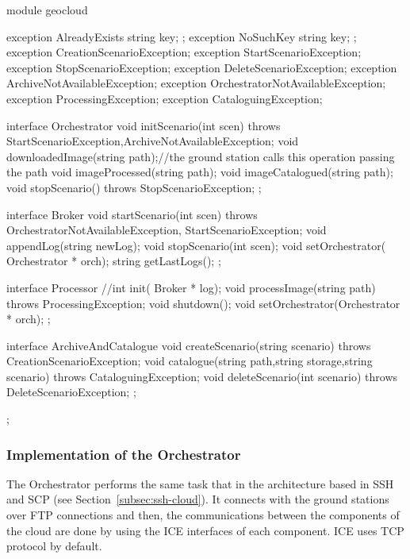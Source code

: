 \begin{listing}[
  float=h!,
  caption  = {Slice of the ICE application},
  label    = code:ice-slice,
style=customc]

module geocloud {
    exception AlreadyExists { string key; };
    exception NoSuchKey { string key; };
    exception CreationScenarioException{};
    exception StartScenarioException{};
    exception StopScenarioException{};
    exception DeleteScenarioException{};
    exception ArchiveNotAvailableException{};
    exception OrchestratorNotAvailableException{};
    exception ProcessingException{};
    exception CataloguingException{};

    interface Orchestrator{
    	void initScenario(int scen) throws StartScenarioException,ArchiveNotAvailableException;
	void downloadedImage(string path);//the ground station calls this operation passing the path
	void imageProcessed(string path);
	void imageCatalogued(string path);
	void stopScenario() throws StopScenarioException;
    };

    interface Broker{
	void startScenario(int scen) throws OrchestratorNotAvailableException, StartScenarioException;
	void appendLog(string newLog);
	void stopScenario(int scen);
	void setOrchestrator( Orchestrator * orch);
	string getLastLogs();
    };


 interface Processor{
	//int init( Broker * log);
       	void processImage(string path) throws ProcessingException;
	void shutdown();
	void setOrchestrator(Orchestrator * orch);
    };



    interface ArchiveAndCatalogue{
	void createScenario(string scenario) throws CreationScenarioException;
	void catalogue(string path,string storage,string scenario) throws CataloguingException;
	void deleteScenario(int scenario) throws DeleteScenarioException;
    };
};
\end{listing}

\subsubsection{Implementation of the Orchestrator}

The Orchestrator performs the same task that in the architecture based in
\ac{SSH} and \ac{SCP} (see Section~\ref{subsec:ssh-cloud}). It connects with the ground stations over \ac{FTP} connections and
then, the communications between the components of the cloud are done by using the
ICE interfaces of each component. ICE uses \ac{TCP} protocol by default.

